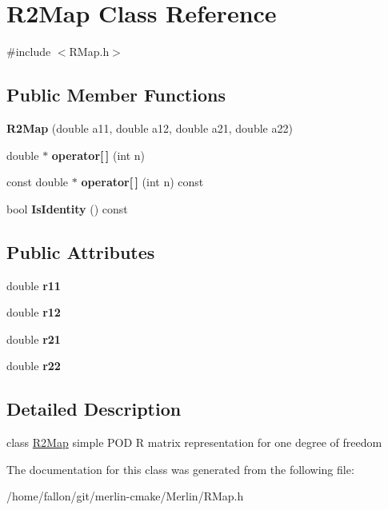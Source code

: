 \hypertarget{classR2Map}{}\section{R2\+Map Class Reference}
\label{classR2Map}


{\ttfamily \#include $<$R\+Map.\+h$>$}

\subsection*{Public Member Functions}
\begin{DoxyCompactItemize}
\item 
\mbox{\label{classR2Map_a02a1e75a1c226fe684c190e37db7d5a1}} 
{\bfseries R2\+Map} (double a11, double a12, double a21, double a22)
\item 
\mbox{\label{classR2Map_a5c45194c6cf04b5851db79b8d5e8ab8d}} 
double $\ast$ {\bfseries operator\mbox{[}$\,$\mbox{]}} (int n)
\item 
\mbox{\label{classR2Map_a8370e7d531d2a37c5d630a36cacc05ab}} 
const double $\ast$ {\bfseries operator\mbox{[}$\,$\mbox{]}} (int n) const
\item 
\mbox{\label{classR2Map_a891f2d8bd13f6fdc61a3206764a1756d}} 
bool {\bfseries Is\+Identity} () const
\end{DoxyCompactItemize}
\subsection*{Public Attributes}
\begin{DoxyCompactItemize}
\item 
\mbox{\label{classR2Map_a7269b538ddc68ccd7d0188f8b27f5e20}} 
double {\bfseries r11}
\item 
\mbox{\label{classR2Map_a13c1a026ade058cca7a2ca2c69c0fb7e}} 
double {\bfseries r12}
\item 
\mbox{\label{classR2Map_a51c748395faa33d08967dca73834afd9}} 
double {\bfseries r21}
\item 
\mbox{\label{classR2Map_a17e0393eee2fcf1cec76d13890475b3c}} 
double {\bfseries r22}
\end{DoxyCompactItemize}


\subsection{Detailed Description}
class \hyperlink{classR2Map}{R2\+Map} simple P\+OD R matrix representation for one degree of freedom 

The documentation for this class was generated from the following file\+:\begin{DoxyCompactItemize}
\item 
/home/fallon/git/merlin-\/cmake/\+Merlin/R\+Map.\+h\end{DoxyCompactItemize}
